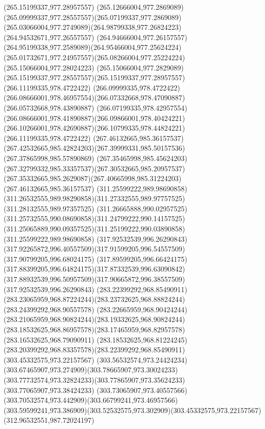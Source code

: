 {{  \moveto(265.15199337,977.28957557)
  \curveto(265.12666004,977.2869089)(265.09999337,977.28557557)(265.07199337,977.2869089)
  \curveto(265.03066004,977.2749089)(264.98799338,977.26824223)(264.94532671,977.26557557)
  \curveto(264.94666004,977.26157557)(264.95199338,977.2589089)(264.95466004,977.25624224)
  \curveto(265.01732671,977.24957557)(265.08266004,977.25224224)(265.15066004,977.28024223)
  \curveto(265.15066004,977.2829089)(265.15199337,977.28557557)(265.15199337,977.28957557)
  \moveto(266.11199335,978.4722422)
  \curveto(266.09999335,978.4722422)(266.08666001,978.46957554)(266.07332668,978.47090887)
  \lineto(266.05732668,978.43890887)
  \curveto(266.07199335,978.42957554)(266.08666001,978.41890887)(266.09866001,978.40424221)
  \curveto(266.10266001,978.42690887)(266.10799335,978.44824221)(266.11199335,978.4722422)
  \moveto(267.46132665,985.36157537)
  \curveto(267.42532665,985.42824203)(267.39999331,985.50157536)(267.37865998,985.57890869)
  \curveto(267.35465998,985.45624203)(267.32799332,985.33357537)(267.30532665,985.20957537)
  \curveto(267.35332665,985.2629087)(267.40665998,985.31224203)(267.46132665,985.36157537)
  \moveto(311.25599222,989.98690858)
  \curveto(311.26532555,989.98290858)(311.27332555,989.97757525)(311.28132555,989.97357525)
  \curveto(311.26665888,990.02957525)(311.25732555,990.08690858)(311.24799222,990.14157525)
  \curveto(311.25065889,990.09357525)(311.25199222,990.03890858)(311.25599222,989.98690858)
  \moveto(317.92532539,996.26290843)
  \curveto(317.92265872,996.40557509)(317.91599205,996.54557509)(317.90799205,996.68024175)
  \curveto(317.89599205,996.66424175)(317.88399205,996.64824175)(317.87332539,996.63090842)
  \curveto(317.88932539,996.50957509)(317.90665872,996.38557509)(317.92532539,996.26290843)
  \moveto(283.22399292,968.85490911)
  \curveto(283.23065959,968.87224244)(283.23732625,968.88824244)(283.24399292,968.90557578)
  \curveto(283.22665959,968.90424244)(283.21065959,968.90824244)(283.19332625,968.90824244)
  \curveto(283.18532625,968.86957578)(283.17465959,968.82957578)(283.16532625,968.79090911)
  \curveto(283.18532625,968.81224245)(283.20399292,968.83357578)(283.22399292,968.85490911)
  \moveto(303.45332575,973.22157567)
  \curveto(303.56532574,973.24424234)(303.67465907,973.274909)(303.78665907,973.30024233)
  \curveto(303.77732574,973.32824233)(303.77865907,973.35624233)(303.77065907,973.38424233)
  \curveto(303.73065907,973.40557566)(303.70532574,973.442909)(303.66799241,973.46957566)
  \curveto(303.59599241,973.386909)(303.52532575,973.302909)(303.45332575,973.22157567)
  \moveto(312.96532551,987.72024197)
}}

